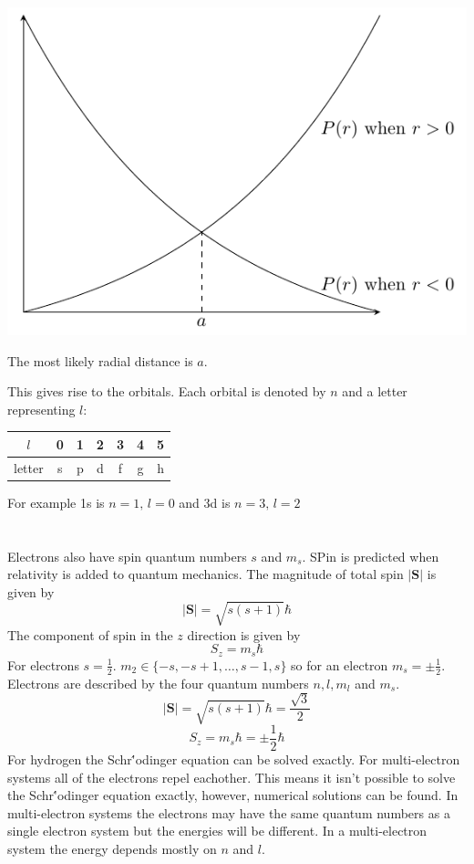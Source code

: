 \documentclass{article}
\renewcommand{\vec}[1]{\underline{#1}}
\renewcommand{\vec}[1]{\bm{#1}}
\newcommand{\vv}[1]{\vec{#1}}
\newcommand{\hb}{\hbar}
\newcounter{example}[section]
\begin{document}
\begin{center}
\includegraphics[scale=0.4]{RadialProbabilityDistribution}
\end{center}
The most likely radial distance is \(a\).

This gives rise to the orbitals. Each orbital is denoted by \(n\) and a letter representing \(l\):

\begin{center}
\begin{tabular}{|c|cccccc|}\hline
\(l\) & 0 & 1 & 2 & 3 & 4 & 5\\\hline
letter& s & p & d & f & g & h\\\hline
\end{tabular}
\end{center}
For example 1s is \(n=1,\,l=0\) and 3d is \(n=3,\,l=2\)


\section{}

Electrons also have spin quantum numbers \(s\) and \(m_s\). SPin is predicted when relativity is added to quantum mechanics. The magnitude of total spin \(|\vv S|\) is given by
\[|\vv S|=\sqrt{s(s+1)}\hb\]
The component of spin in the \(z\) direction is given by
\[S_z=m_s\hb\]
For electrons \(s=\frac12\). \(m_2\in\{-s,-s+1,\dots ,s-1,s\}\) so for an electron \(m_s=\pm\frac12\). Electrons are described by the four quantum numbers \(n,l,m_l\) and \(m_s\).
\[|\vv S|=\sqrt{s(s+1)}\hb=\frac{\sqrt{3}}{2}\]
\[S_z=m_s\hb=\pm\frac12\hb\]
For hydrogen the Schr\''odinger equation can be solved exactly. For multi-electron systems all of the electrons repel eachother. This means it isn't possible to solve the Schr\''odinger equation exactly, however, numerical solutions can be found. In multi-electron systems the electrons may have the same quantum numbers as a single electron system but the energies will be different. In a multi-electron system the energy depends mostly on \(n\) and \(l\).
\end{document}
